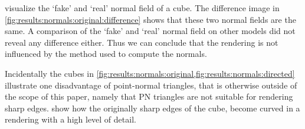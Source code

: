 

 visualize the `fake' and `real' normal field of a cube. The difference image in \cref{fig:results:normals:original:difference} shows that these two normal fields are the same. A comparison of the `fake' and `real' normal field on other models did not reveal any difference either.  Thus we can conclude that the rendering is not influenced by the method used to compute the normals. 

Incidentally the cubes in \cref{fig:results:normals:original,fig:results:normals:directed} illustrate one disadvantage of point-normal triangles, that is otherwise outside of the scope of this paper, namely that PN triangles are not suitable for rendering sharp edges.  show how the originally sharp edges of the cube, become curved in a rendering with a high level of detail.

